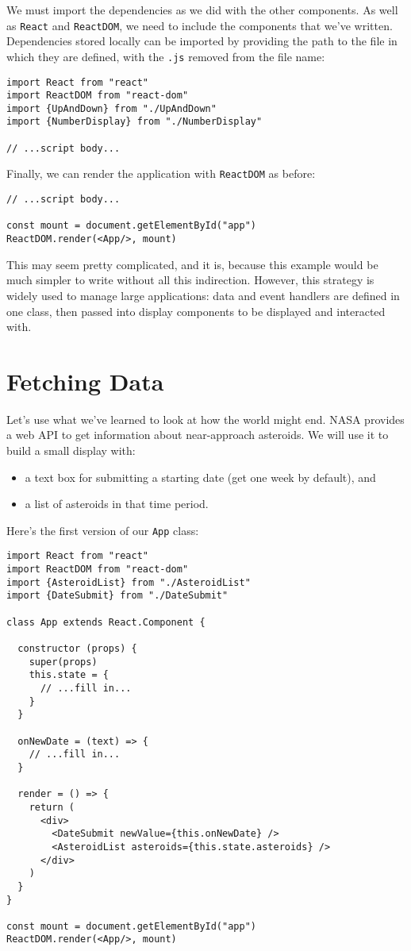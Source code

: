 We must import the dependencies as we did with the other components.
As well as \texttt{React} and \texttt{ReactDOM},
we need to include the components that we've written.
Dependencies stored locally can be imported by providing the path to
the file in which they are defined,
with the \texttt{.js} removed from the file name:

\begin{verbatim}
import React from "react"
import ReactDOM from "react-dom"
import {UpAndDown} from "./UpAndDown"
import {NumberDisplay} from "./NumberDisplay"

// ...script body...
\end{verbatim}

Finally,
we can render the application with \texttt{ReactDOM} as before:

\begin{verbatim}
// ...script body...

const mount = document.getElementById("app")
ReactDOM.render(<App/>, mount)
\end{verbatim}

This may seem pretty complicated,
and it is,
because this example would be much simpler to write without all this indirection.
However,
this strategy is widely used to manage large applications:
data and event handlers are defined in one class,
then passed into display components to be displayed and interacted with.

\section{Fetching Data}\label{s:interactive-fetching}

Let's use what we've learned to look at how the world might end.
NASA provides a web API to get information about near-approach asteroids.
We will use it to build a small display with:

\begin{itemize}
\item
  a text box for submitting a starting date (get one week by default), and
\item
  a list of asteroids in that time period.
\end{itemize}

Here's the first version of our \texttt{App} class:

\begin{verbatim}
import React from "react"
import ReactDOM from "react-dom"
import {AsteroidList} from "./AsteroidList"
import {DateSubmit} from "./DateSubmit"

class App extends React.Component {

  constructor (props) {
    super(props)
    this.state = {
      // ...fill in...
    }
  }

  onNewDate = (text) => {
    // ...fill in...
  }

  render = () => {
    return (
      <div>
        <DateSubmit newValue={this.onNewDate} />
        <AsteroidList asteroids={this.state.asteroids} />
      </div>
    )
  }
}

const mount = document.getElementById("app")
ReactDOM.render(<App/>, mount)
\end{verbatim}

